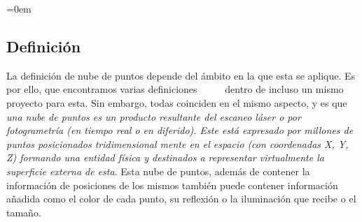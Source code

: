 \parindent=0em
\subsection{Definición}
\noindent

La definición de nube de puntos depende del ámbito en la que esta se aplique. Es por ello, que encontramos varias definiciones ~\cite{DefinicionesNubePuntos1} ~\cite{DefinicionesNubePuntos2} ~\cite{DefinicionesNubePuntos3} dentro de incluso un mismo proyecto para esta. Sin embargo, todas coinciden en el mismo aspecto, y es que \textit{ una nube de puntos es un producto resultante del escaneo láser o por fotogrametría (en tiempo real o en diferido). Este está expresado por millones de puntos posicionados tridimensional mente en el espacio (con coordenadas X, Y, Z) formando una entidad física y destinados a representar virtualmente la superficie externa de esta}. Esta nube de puntos, además de contener la información de posiciones de los mismos también puede contener información añadida como el color de cada punto, su reflexión o la iluminación que recibe o el tamaño.\\